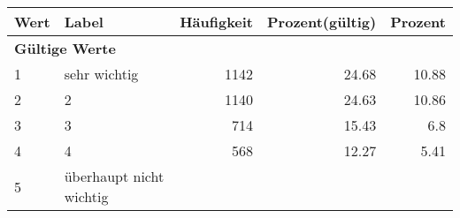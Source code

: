      \begin{longtable}{lXrrr}
     \toprule
     \textbf{Wert} & \textbf{Label} & \textbf{Häufigkeit} & \textbf{Prozent(gültig)} & \textbf{Prozent} \\
     \endhead
     \midrule
     \multicolumn{5}{l}{\textbf{Gültige Werte}}\\

     1 &
     \multicolumn{1}{X}{ sehr wichtig   } &


       \num{1142} &
       \num[round-mode=places,round-precision=2]{24.68} &
         \num[round-mode=places,round-precision=2]{10.88} \\

     2 &
     \multicolumn{1}{X}{ 2   } &


       \num{1140} &
       \num[round-mode=places,round-precision=2]{24.63} &
         \num[round-mode=places,round-precision=2]{10.86} \\

     3 &
     \multicolumn{1}{X}{ 3   } &


       \num{714} &
       \num[round-mode=places,round-precision=2]{15.43} &
         \num[round-mode=places,round-precision=2]{6.8} \\

     4 &
     \multicolumn{1}{X}{ 4   } &


       \num{568} &
       \num[round-mode=places,round-precision=2]{12.27} &
         \num[round-mode=places,round-precision=2]{5.41} \\

     5 &
     \multicolumn{1}{X}{ überhaupt nicht wichtig   } &



\end{longtable}
